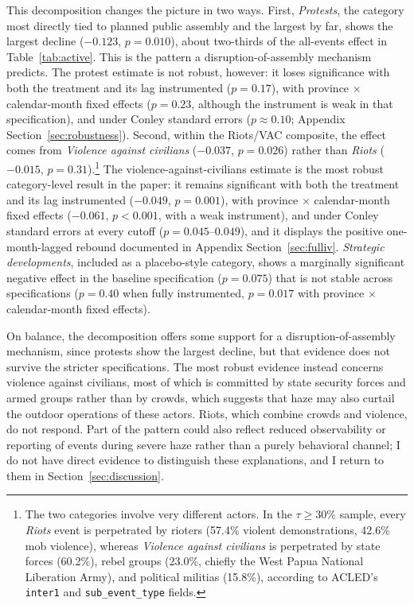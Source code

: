 \documentclass[12pt]{article}
\begin{document}
This decomposition changes the picture in two ways. First, \emph{Protests}, the category most directly tied to planned public assembly and the largest by far, shows the largest decline ($-0.123$, $p=0.010$), about two-thirds of the all-events effect in Table~\ref{tab:active}. This is the pattern a disruption-of-assembly mechanism predicts. The protest estimate is not robust, however: it loses significance with both the treatment and its lag instrumented ($p=0.17$), with province $\times$ calendar-month fixed effects ($p=0.23$, although the instrument is weak in that specification), and under Conley standard errors ($p \approx 0.10$; Appendix Section~\ref{sec:robustness}). Second, within the Riots/VAC composite, the effect comes from \emph{Violence against civilians} ($-0.037$, $p=0.026$) rather than \emph{Riots} ($-0.015$, $p=0.31$).\footnote{The two categories involve very different actors. In the $\tau \geq 30\%$ sample, every \emph{Riots} event is perpetrated by rioters (57.4\% violent demonstrations, 42.6\% mob violence), whereas \emph{Violence against civilians} is perpetrated by state forces (60.2\%), rebel groups (23.0\%, chiefly the West Papua National Liberation Army), and political militias (15.8\%), according to ACLED's \texttt{inter1} and \texttt{sub\_event\_type} fields.} The violence-against-civilians estimate is the most robust category-level result in the paper: it remains significant with both the treatment and its lag instrumented ($-0.049$, $p=0.001$), with province $\times$ calendar-month fixed effects ($-0.061$, $p<0.001$, with a weak instrument), and under Conley standard errors at every cutoff ($p=0.045$--$0.049$), and it displays the positive one-month-lagged rebound documented in Appendix Section~\ref{sec:fulliv}. \emph{Strategic developments}, included as a placebo-style category, shows a marginally significant negative effect in the baseline specification ($p=0.075$) that is not stable across specifications ($p=0.40$ when fully instrumented, $p=0.017$ with province $\times$ calendar-month fixed effects).

On balance, the decomposition offers some support for a disruption-of-assembly mechanism, since protests show the largest decline, but that evidence does not survive the stricter specifications. The most robust evidence instead concerns violence against civilians, most of which is committed by state security forces and armed groups rather than by crowds, which suggests that haze may also curtail the outdoor operations of these actors. Riots, which combine crowds and violence, do not respond. Part of the pattern could also reflect reduced observability or reporting of events during severe haze rather than a purely behavioral channel; I do not have direct evidence to distinguish these explanations, and I return to them in Section~\ref{sec:discussion}.
\end{document}
